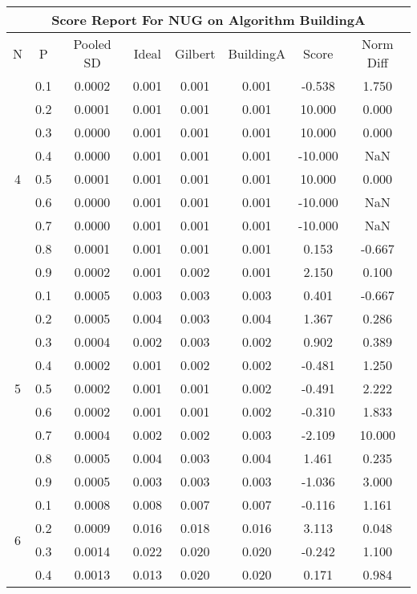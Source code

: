 \documentclass[11pt,a4paper]{report}
\begin{document}
\begin{longtable}{ | c | c || c | c | c | c | c | c | }
\hline
\multicolumn{8}{|c|}{ Score Report For NUG on Algorithm BuildingA} \\
\hline
N & P & Pooled SD &  Ideal &  Gilbert & BuildingA  & Score & Norm Diff \\
 \hline
 \hline
 \endhead
\multirow{9}{*}{4} & 0.1 & 0.0002 & 0.001 & 0.001 & 0.001 & -0.538 & 1.750 \\
 & 0.2 & 0.0001 & 0.001 & 0.001 & 0.001 & 10.000 & 0.000 \\
 & 0.3 & 0.0000 & 0.001 & 0.001 & 0.001 & 10.000 & 0.000 \\
 & 0.4 & 0.0000 & 0.001 & 0.001 & 0.001 & -10.000 & NaN \\
 & 0.5 & 0.0001 & 0.001 & 0.001 & 0.001 & 10.000 & 0.000 \\
 & 0.6 & 0.0000 & 0.001 & 0.001 & 0.001 & -10.000 & NaN \\
 & 0.7 & 0.0000 & 0.001 & 0.001 & 0.001 & -10.000 & NaN \\
 & 0.8 & 0.0001 & 0.001 & 0.001 & 0.001 & 0.153 & -0.667 \\
 & 0.9 & 0.0002 & 0.001 & 0.002 & 0.001 & 2.150 & 0.100 \\
 \hline
\multirow{9}{*}{5} & 0.1 & 0.0005 & 0.003 & 0.003 & 0.003 & 0.401 & -0.667 \\
 & 0.2 & 0.0005 & 0.004 & 0.003 & 0.004 & 1.367 & 0.286 \\
 & 0.3 & 0.0004 & 0.002 & 0.003 & 0.002 & 0.902 & 0.389 \\
 & 0.4 & 0.0002 & 0.001 & 0.002 & 0.002 & -0.481 & 1.250 \\
 & 0.5 & 0.0002 & 0.001 & 0.001 & 0.002 & -0.491 & 2.222 \\
 & 0.6 & 0.0002 & 0.001 & 0.001 & 0.002 & -0.310 & 1.833 \\
 & 0.7 & 0.0004 & 0.002 & 0.002 & 0.003 & -2.109 & 10.000 \\
 & 0.8 & 0.0005 & 0.004 & 0.003 & 0.004 & 1.461 & 0.235 \\
 & 0.9 & 0.0005 & 0.003 & 0.003 & 0.003 & -1.036 & 3.000 \\
 \hline
\multirow{9}{*}{6} & 0.1 & 0.0008 & 0.008 & 0.007 & 0.007 & -0.116 & 1.161 \\
 & 0.2 & 0.0009 & 0.016 & 0.018 & 0.016 & 3.113 & 0.048 \\
 & 0.3 & 0.0014 & 0.022 & 0.020 & 0.020 & -0.242 & 1.100 \\
 & 0.4 & 0.0013 & 0.013 & 0.020 & 0.020 & 0.171 & 0.984 \\

\end{longtable}
\end{document}
